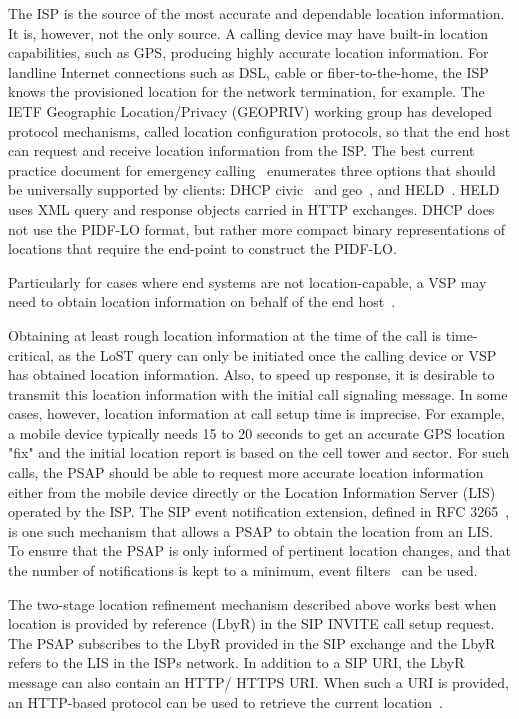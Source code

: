 \documentclass[12pt]{article}
\begin{document}
The ISP is the source of the most accurate and dependable location information. It is, however, not the only source. A calling device may have built-in location capabilities, such as GPS, producing highly accurate location information. For landline Internet connections such as DSL, cable or fiber-to-the-home, the ISP knows the provisioned location for the network termination, for example. The IETF Geographic Location/Privacy (GEOPRIV) working group has developed protocol mechanisms, called location configuration protocols, so that the end host can request and receive location information from the ISP. The best current practice document for emergency calling~\cite{draft-ietf-ecrit-phonebcp} enumerates three options that should be universally supported by clients: DHCP civic~\cite{rfc4776} and geo~\cite{rfc6225}, and HELD~\cite{rfc5985}. HELD uses XML query and response objects carried in HTTP exchanges. DHCP does not use the PIDF-LO format, but rather more compact binary representations of locations that require the end-point to construct the PIDF-LO.

Particularly for cases where end systems are not location-capable, a VSP may need to obtain location information on behalf of the end host~\cite{rfc6155}.

Obtaining at least rough location information at the time of the call is time-critical, as the LoST query can only be initiated once the calling device or VSP has obtained location information. Also, to speed up response, it is desirable to transmit this location information with the initial call signaling message. In some cases, however, location information at call setup time is imprecise. For example, a mobile device typically needs 15 to 20 seconds to get an accurate GPS location "fix" and the initial location report is based on the cell tower and sector. For such calls, the PSAP should be able to request more accurate location information either from the mobile device directly or the Location Information Server (LIS) operated by the ISP. The SIP event notification extension, defined in RFC 3265~\cite{rfc3265}, is one such mechanism that allows a PSAP to obtain the location from an LIS. To ensure that the PSAP is only informed of pertinent location changes, and that the number of notifications is kept to a minimum, event filters~\cite{RFC6447} can be used. 

The two-stage location refinement mechanism described above works best when location is provided by reference (LbyR) in the SIP INVITE call setup request. The PSAP subscribes to the LbyR provided in the SIP exchange and the LbyR refers to the LIS in the ISPs network. In addition to a SIP URI, the LbyR message can also contain an HTTP/ HTTPS URI. When such a URI is provided, an HTTP-based protocol can be used to retrieve the current location~\cite{rfc6753}. 
\end{document}
